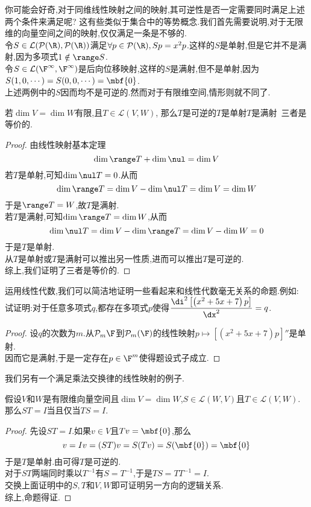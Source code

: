 \documentclass{ctexart}
\begin{document}
你可能会好奇,对于同维线性映射之间的映射,其可逆性是否一定需要同时满足上述两个条件来满足呢?
这有些类似于集合中的等势概念.我们首先需要说明,对于无限维的向量空间之间的映射,仅仅满足一条是不够的.\\
令$S\in\mathcal{L}(\mathcal{P}(\R),\mathcal{P}(\R))$满足$\forall p\in\mathcal{P}(\R),Sp=x^2p$.这样的$S$是单射,但是它并不是满射,因为多项式$1\notin\range S$.\\
令$S\in\mathcal{L}(\F^{\infty},\F^{\infty})$是后向位移映射,这样的$S$是满射,但不是单射,因为$S(1,0,\cdots)=S(0,0,\cdots)=\mbf{0}$.\\
上述两例中的$S$因而均不是可逆的.然而对于有限维空间,情形则就不同了.
\begin{formal}[1.5 单射,满射与可逆的等价性]
    若$\dim V=\dim W$有限,且$T\in\mathcal{L}(V,W)$,
    那么$T$是可逆的$T$是单射$T$是满射\ 三者是等价的.
\end{formal}
\begin{proof}
    由线性映射基本定理$$\dim\range T+\dim\nul=\dim V$$
    若$T$是单射,可知$\dim\nul T=0$.从而
    $$\dim\range T=\dim V-\dim\nul T=\dim V=\dim W$$
    于是$\range T=W$,故$T$是满射.\\
    若$T$是满射,可知$\dim\range T=\dim W$,从而
    $$\dim\nul T=\dim V-\dim\range T=\dim V-\dim W=0$$
    于是$T$是单射.\\
    从$T$是单射或$T$是满射可以推出另一性质,进而可以推出$T$是可逆的.\\
    综上,我们证明了三者是等价的.
\end{proof}\noindent
运用线性代数,我们可以简洁地证明一些看起来和线性代数毫无关系的命题.例如:\\
试证明:对于任意多项式$q$,都存在多项式$p$使得$\dfrac{\di^2\left[\left(x^2+5x+7\right)p\right]}{\dx^2}=q$.
\begin{proof}
    设$q$的次数为$m$.从$\mathcal{P}_m{\F}$到$\mathcal{P}_m(\F)$的线性映射$p\mapsto \left[\left(x^2+5x+7\right)p\right]''$是单射.\\
    因而它是满射,于是一定存在$p\in\F^m$使得题设式子成立.
\end{proof}\noindent
我们另有一个满足乘法交换律的线性映射的例子.
\begin{formal}[1.6 满足乘法交换律的线性映射]
    假设$V$和$W$是有限维向量空间且$\dim V=\dim W$,$S\in\mathcal{L}(W,V)$且$T\in\mathcal{L}(V,W)$.\\
    那么$ST=I$当且仅当$TS=I$.
\end{formal}
\begin{proof}
    先设$ST=I$.如果$v\in V$且$Tv=\mbf{0}$,那么
    $$v=Iv=(ST)v=S(Tv)=S(\mbf{0})=\mbf{0}$$
    于是$T$是单射.由可得$T$是可逆的.\\
    对于$ST$两端同时乘以$T^{-1}$有$S=T^{-1}$,于是$TS=TT^{-1}=I$.\\
    交换上面证明中的$S,T$和$V,W$即可证明另一方向的逻辑关系.\\
    综上,命题得证.
\end{proof}\noindent
\end{document}
